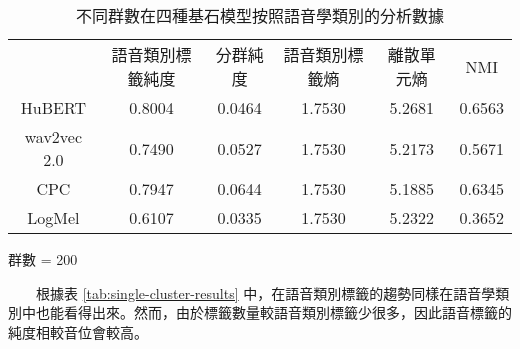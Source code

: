 \begin{table}[!htbp]
            \vspace{0.5cm}        

            \begin{subtable}[t]{\textwidth}
                \centering
                \begin{tabular}{cccccc}
                                & 語音類別標籤純度 & 分群純度 & 語音類別標籤熵 & 離散單元熵 &     NMI \\
                    HuBERT      &           0.8004 &   0.0464 &         1.7530 &     5.2681 &  0.6563 \\   %
                    wav2vec 2.0 &           0.7490 &   0.0527 &         1.7530 &     5.2173 &  0.5671 \\   %
                    CPC         &           0.7947 &   0.0644 &         1.7530 &     5.1885 &  0.6345 \\   %
                    LogMel      &           0.6107 &   0.0335 &         1.7530 &     5.2322 &  0.3652 \\   %
                \end{tabular}
                \caption{群數 = 200}
                \label{tab:ch3-clu200}
            \end{subtable}        

            \caption{不同群數在四種基石模型按照語音學類別的分析數據}
            \label{tab:single-cluster-phonetype-results}
        \end{table}
        　　根據表 \ref{tab:single-cluster-results} 中，在語音類別標籤的趨勢同樣在語音學類別中也能看得出來。然而，由於標籤數量較語音類別標籤少很多，因此語音標籤的純度相較音位會較高。
